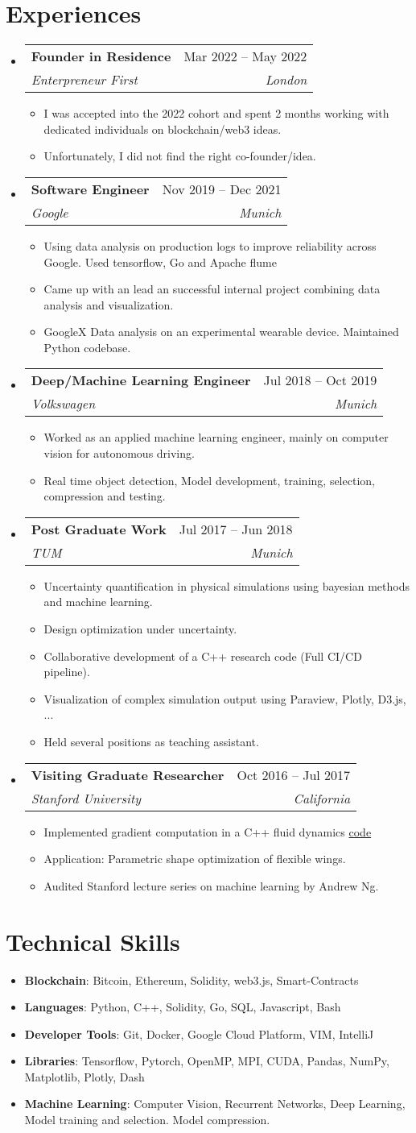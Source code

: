 \documentclass[letterpaper,11pt]{article}
\makeatletter
\newcommand{\resumeItem}[1]{
  \item\small{
    {#1 \vspace{-2pt}}
  }
}
\newcommand{\resumeSubheading}[4]{
  \vspace{-2pt}\item
    \begin{tabular*}{0.97\textwidth}[t]{l@{\extracolsep{\fill}}r}
      \textbf{#1} & #2 \\
      \textit{\small#3} & \textit{\small #4} \\
    \end{tabular*}\vspace{-7pt}
}
\newcommand{\resumeSubHeadingListStart}{\begin{itemize}[leftmargin=0.15in, label={}]}
\newcommand{\resumeSubHeadingListEnd}{\end{itemize}}
\newcommand{\resumeItemListStart}{\begin{itemize}}
\newcommand{\resumeItemListEnd}{\end{itemize}\vspace{-5pt}}
\makeatother
\begin{document}
\section{Experiences}
  \resumeSubHeadingListStart
    \resumeSubheading
      {Founder in Residence }{Mar 2022 -- May 2022}
      {Enterpreneur First}{London}
    \resumeItemListStart
      \resumeItem{I was accepted into the 2022 cohort and spent 2 months working with dedicated individuals on blockchain/web3 ideas.}
      \resumeItem{Unfortunately, I did not find the right co-founder/idea.}
    \resumeItemListEnd
    \resumeSubheading
      {Software Engineer }{Nov 2019 -- Dec 2021}
      {Google}{Munich}
    \resumeItemListStart
      \resumeItem{Using data analysis on production logs to improve reliability across Google. Used tensorflow, Go and Apache flume}
      \resumeItem{Came up with an lead an successful internal project combining data analysis and visualization.}
      \resumeItem{GoogleX Data analysis on an experimental wearable device. Maintained Python codebase.}
    \resumeItemListEnd
    \resumeSubheading
      {Deep/Machine Learning Engineer }{Jul 2018 -- Oct 2019}
      {Volkswagen}{Munich}
    \resumeItemListStart
      \resumeItem{Worked as an applied machine learning engineer, mainly on computer vision for autonomous driving.}
      \resumeItem{Real time object detection, Model development, training, selection, compression and testing.}
    \resumeItemListEnd
    \resumeSubheading
      {Post Graduate Work }{Jul 2017 -- Jun 2018}
      {TUM}{Munich}
    \resumeItemListStart
      \resumeItem{Uncertainty quantification in physical simulations using bayesian methods and machine learning.}
      \resumeItem{Design optimization under uncertainty.}
      \resumeItem{Collaborative development of a C++ research code (Full CI/CD pipeline).}
      \resumeItem{Visualization of complex simulation output using Paraview, Plotly, D3.js, ...}
      \resumeItem{Held several positions as teaching assistant.}
    \resumeItemListEnd
    \resumeSubheading
      {Visiting Graduate Researcher }{Oct 2016 -- Jul 2017}
      {Stanford University}{California}
    \resumeItemListStart
      \resumeItem{Implemented gradient computation in a C++ fluid dynamics \href{https://bitbucket.org/frg/aero-f/src/master/}{code}}
      \resumeItem{Application: Parametric shape optimization of flexible wings.}
      \resumeItem{Audited Stanford lecture series on machine learning by Andrew Ng.}
    \resumeItemListEnd
  \resumeSubHeadingListEnd

\section{Technical Skills}
  \resumeItemListStart
    \resumeItem{ \textbf{Blockchain}: Bitcoin, Ethereum, Solidity, web3.js, Smart-Contracts}
    \resumeItem{ \textbf{Languages}: Python, C++, Solidity, Go, SQL, Javascript, Bash}
    \resumeItem{ \textbf{Developer Tools}: Git, Docker, Google Cloud Platform, VIM, IntelliJ}
    \resumeItem{ \textbf{Libraries}: Tensorflow, Pytorch, OpenMP, MPI, CUDA, Pandas, NumPy, Matplotlib, Plotly, Dash}
    \resumeItem{ \textbf{Machine Learning}: Computer Vision, Recurrent Networks, Deep Learning, Model training and selection. Model compression.}
  \resumeItemListEnd


\end{document}
